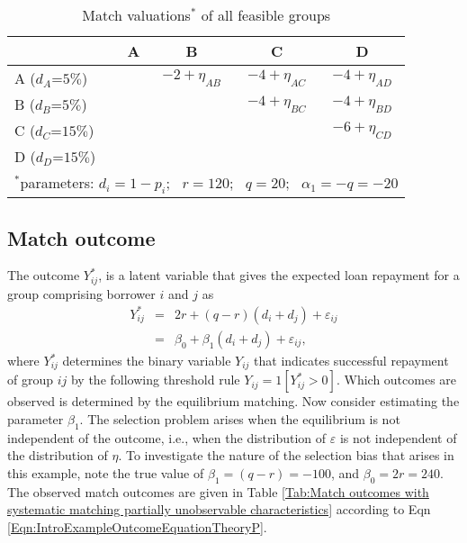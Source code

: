 \begin{table}[htbp!]
\small
  \begin{center}
    \begin{minipage}[c]{0.35\linewidth}
      \caption{Match valuations$^*$ of all feasible groups} \label{Tab:Match Valuations}
    \end{minipage} \hfill
    \begin{minipage}[c]{0.6\linewidth}
\centering 
\begin{tabular}{l||cccc}
	& \multicolumn{1}{|c|}{A} & \multicolumn{1}{|c|}{B} & \multicolumn{1}{|c|}{C} & \multicolumn{1}{|c|}{D} \\
\hline \hline
A ($d_A$=$5\%$) && \multicolumn{1}{|c|}{$-2+\eta_{AB}$} & \multicolumn{1}{|c|}{$-4+\eta_{AC}$} & \multicolumn{1}{|c|}{$-4+\eta_{AD}$} \\
\cline{3-5} \cline{1-1}
B ($d_B$=$5\%$) & && \multicolumn{1}{|c|}{$-4+\eta_{BC}$} & \multicolumn{1}{|c|}{$-4+\eta_{BD}$} \\
\cline{4-5} \cline{1-1}
C ($d_C$=$15\%$) && & & \multicolumn{1}{|c|}{$-6+\eta_{CD}$}\\
\cline{5-5} \cline{1-1}
D ($d_D$=$15\%$) && & & \\
\cline{1-1}
\multicolumn{5}{l}{\footnotesize $^*$parameters: $d_i=1-p_i$; \ $r=120$; \ $q=20$; \ $\alpha_1=-q=-20$}
\end{tabular}
    \end{minipage} 
  \end{center}
\end{table}


\subsection{Match outcome}

The outcome $Y^*_{ij}$, is a latent variable that gives the expected loan repayment for a group comprising borrower $i$ and $j$ as
\begin{eqnarray} 
Y^*_{ij} &=& 2r + (q-r)(d_i+d_j) + \varepsilon_{ij}\\
         &=& \beta_0 + \beta_1(d_i + d_j) + \varepsilon_{ij}, \label{Eqn:IntroExampleOutcomeEquationTheoryP}
\end{eqnarray}
where $Y^*_{ij}$ determines the binary variable $Y_{ij}$ that indicates successful repayment of group $ij$ by the following threshold rule $Y_{ij}=1[Y^*_{ij}>0]$. Which outcomes are observed is determined by the equilibrium matching. Now consider estimating the parameter $\beta_1$. The selection problem arises when the equilibrium is not independent of the outcome, i.e., when the distribution of $\varepsilon$ is not independent of the distribution of $\eta$. %
To investigate the nature of the selection bias that arises in this example, note the true value of $\beta_1=(q-r)=-100$, and $\beta_0=2r=240$. The observed match outcomes are given in Table \ref{Tab:Match outcomes with systematic matching partially unobservable characteristics} according to Eqn \ref{Eqn:IntroExampleOutcomeEquationTheoryP}.


